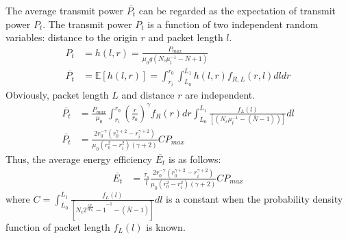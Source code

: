 The average transmit power $\overline{P_t}$ can be regarded as the expectation of transmit power $P_t$. The transmit power $P_t$ is a function of two independent random variables: distance to the origin $r$ and packet length $l$.
\begin{align}
P_t &= h(l, r) = \frac{P_{max}}{\mu_0 g \left( N_c\mu_t^{-1} - \overline{N}+1\right)} \nonumber \\
\overline{P_t} &=\mathbb{E}\left[ h(l, r)\right] =\int_{r_i}^{r_0} \int_{L_{0}}^{L_{1}}  h\left(l,  r\right) f_{R, L} \left( r, l \right) dldr \nonumber
\end{align}
Obviously, packet length $L$ and distance $r$ are independent.
\begin{align}
\overline{P_t} & = \frac{P_{max}}{\mu_0}\int_{r_i}^{r_0} \left( \frac{r}{r_0}\right)^{\gamma} f_R(r)dr\int_{L_{0}}^{L_{1}} \frac{f_L(l)}{[(N_{c}\mu_{t}^{-1}-(\bar{N}-1))]}dl \nonumber\\
\overline{P_t} & = \frac{2r_0^{-\gamma}(r_0^{\gamma+2}-r_i^{\gamma+2})}{\mu_0(r_0^2-r_i^2)(\gamma+2)} C P_{max}
\end{align}
Thus, the average energy efficiency $\overline{E_{t}}$ is as follows:
\begin{align}
	\overline{E_t} & = \frac{\tau_s}{l}\frac{2r_0^{-\gamma}(r_0^{\gamma+2}-r_i^{\gamma+2})}{\mu_0(r_0^2-r_i^2)(\gamma+2)} C P_{max}
\end{align}
where $C=\int_{L_{0}}^{L_{1}} \frac{f_L(l)}{[ N_c{2^{\frac{lN_c}{W\tau_s}}-1}^{-1}-(\bar{N}-1)]}dl$ is a constant when the probability density function of packet length $f_L(l)$ is known. 
